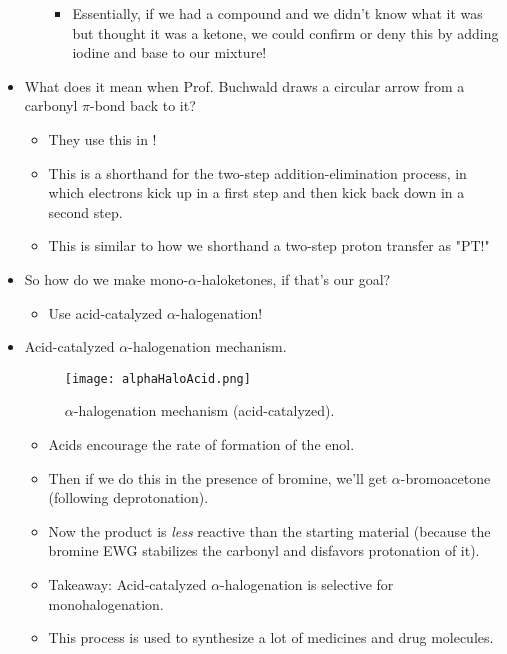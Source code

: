 \documentclass[../notes.tex]{subfiles}
\begin{document}
\begin{itemize}
\begin{itemize}
\begin{itemize}
            \item Essentially, if we had a compound and we didn't know what it was but thought it was a ketone, we could confirm or deny this by adding iodine and base to our mixture!
        \end{itemize}
    \end{itemize}
    \item What does it mean when Prof. Buchwald draws a circular arrow from a carbonyl $\pi$-bond back to it?
    \begin{itemize}
        \item They use this in \textcite{bib:Clayden}!
        \item This is a shorthand for the two-step addition-elimination process, in which electrons kick up in a first step and then kick back down in a second step.
        \item This is similar to how we shorthand a two-step proton transfer as "PT!"
    \end{itemize}
    \item So how do we make mono-$\alpha$-haloketones, if that's our goal?
    \begin{itemize}
        \item Use acid-catalyzed $\alpha$-halogenation!
    \end{itemize}
    \item Acid-catalyzed $\alpha$-halogenation mechanism.
    \begin{figure}[h!]
        \centering
        \texttt{[image: alphaHaloAcid.png]}
        \caption{$\alpha$-halogenation mechanism (acid-catalyzed).}
        \label{fig:alphaHaloAcid}
    \end{figure}
    \begin{itemize}
        \item Acids encourage the rate of formation of the enol.
        \item Then if we do this in the presence of bromine, we'll get $\alpha$-bromoacetone (following deprotonation).
        \item Now the product is \emph{less} reactive than the starting material (because the bromine EWG stabilizes the carbonyl and disfavors protonation of it).
        \item Takeaway: Acid-catalyzed $\alpha$-halogenation is selective for monohalogenation.
        \item This process is used to synthesize a lot of medicines and drug molecules.
    \end{itemize}

\end{itemize}
\end{document}
